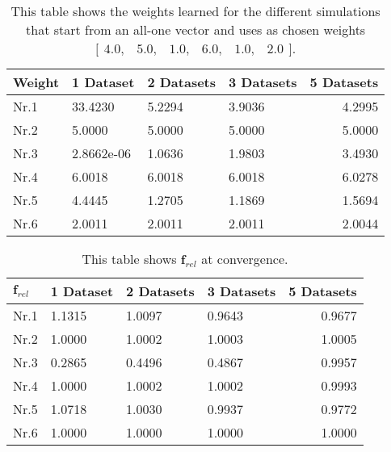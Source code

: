 \begin{table}[h!]
	\centering
	\begin{tabular}{@{}llllr@{}} \toprule
		\textbf{Weight}   & 1 Dataset    & 2 Datasets     & 3 Datasets & 5 Datasets\\ \midrule
		Nr.1       		  &33.4230       & 5.2294       & 3.9036 & 4.2995 		\\
		Nr.2              & 5.0000         & 5.0000          & 5.0000 &5.0000      \\
		Nr.3              & 2.8662e-06     & 1.0636      & 1.9803   &3.4930   \\
		Nr.4              & 6.0018           & 6.0018            &   6.0018&6.0278     \\
		Nr.5              & 4.4445     & 1.2705      & 1.1869 &1.5694      \\
		Nr.6              & 2.0011        & 2.0011         & 2.0011 & 2.0044     \\ \bottomrule
	\end{tabular}
	\caption{This table shows the weights learned for the different simulations that start from an all-one vector and uses as chosen weights $\bigl[ \begin{smallmatrix} 4.0,&5.0,&1.0,&6.0,&1.0,&2.0\end{smallmatrix}\bigr]$.}
	\label{tab:complex_learning_weights}
\end{table}

\begin{table}[h!]
	\centering
	\begin{tabular}{@{}llllr@{}} \toprule
		$\bm{f}_{rel}$   & 1 Dataset    & 2 Datasets & 3 Datasets&5 Datasets\\ \midrule
		Nr.1       		  &1.1315        & 1.0097       & 0.9643&0.9677		\\
		Nr.2              & 1.0000         & 1.0002     & 1.0003&1.0005        \\
		Nr.3              & 0.2865     & 0.4496     	& 0.4867  &0.9957     \\
		Nr.4              & 1.0000           & 1.0002   &   1.0002 &0.9993     \\
		Nr.5              & 1.0718     & 1.0030         & 0.9937 &0.9772       \\
		Nr.6              & 1.0000        & 1.0000      & 1.0000 &1.0000    \\ \bottomrule
	\end{tabular}
	\caption{This table shows $\bm{f}_{rel}$ at convergence.}
	\label{tab:complex_frel}
\end{table}

